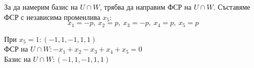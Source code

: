 \documentclass{article}
\begin{document}
\newpage
За да намерим базис на $U \cap W$, трябва да направим ФСР на $U \cap W$.
Съставяме ФСР с независима променлива $x_5$:
\[
    x_1 = -p, \ x_2=p, \ x_3=-p, \ x_4=p, \ x_5=p
\]
\begin{center}
    При $x_5 = 1: (-1, 1, -1, 1, 1)$ \\
    ФСР на $U \cap W :-x_1 +x_2 - x_3 +x_4 +x_5 =0$\\
    Базис на $U \cap W:(-1, 1, -1, 1, 1)$
\end{center}
\end{document}
